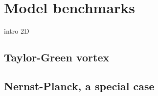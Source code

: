 \chapter{Model benchmarks}
intro 2D



\section{Taylor-Green vortex}





\section{Nernst-Planck, a special case}
